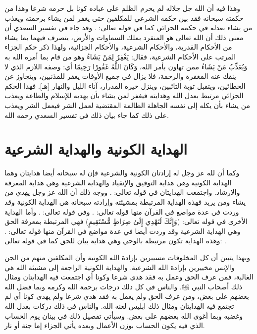 وهذا فيه أن الله جل جلاله لم يحرم الظلم على عباده كونا بل حرمه شرعا وهذا من حكمته سبحانه فقد بين حكمه الشرعي للمكلفين حتى يغفر لمن يشاء برحمته ويعذب من يشاء بعدله في حكمه الجزائي كما في قوله تعالى: 
\quranayah*[48][14]{\footnotesize \surahname*[48]}.  وقد جاء في تفسير السعدي أن معنى ذلك أن الله تعالى هو المنفرد بملك السماوات والأرض، يتصرف فيهما بما يشاء من الأحكام القدرية، والأحكام الشرعية، والأحكام الجزائية، ولهذا ذكر حكم الجزاء المرتب على الأحكام الشرعية، فقال: { يَغْفِرُ لِمَنْ يَشَاءُ } وهو من قام بما أمره الله به { وَيُعَذِّبُ مَنْ يَشَاءُ } ممن تهاون بأمر الله، { وَكَانَ اللَّهُ غَفُورًا رَحِيمًا } أي: وصفه اللازم الذي لا ينفك عنه المغفرة والرحمة، فلا يزال في جميع الأوقات يغفر للمذنبين، ويتجاوز عن الخطائين، ويتقبل توبة التائبين، وينزل خيره المدرار، آناء الليل والنهار [هـ]. فهذا الحكم الجزائي مرتبط بعدل الله وهدايته فيغفر لمن يشاء بأن يهديه للإسلام والطاعة ويعذب من يشاء بأن يكله إلى نفسه الجاهلة الظالمة المقتضية لعمل الشر فيعمل الشر ويعذب على ذلك كما جاء بيان ذلك في تفسير السعدي رحمه الله.

\section{الهداية الكونية والهداية الشرعية}

وكما أن لله عز وجل له إرادتان الكونية والشرعية فإن له سبحانه أيضا هدايتان وهما الهداية الكونية وهي هداية التوفيق والإنقياد والهداية الشرعية وهي هداية المعرفة والإرشاد. واجتمعت الهدايتان في قوله تعالى:
\quranayah*[42][52]{\footnotesize \surahname*[42]}. ووجه ذلك أن الله عز وجل يهدي من يشاء ومن يريد فهذه الهداية المرتبطة بمشيئته وإرادته سبحانه هي الهداية الكونية وقد وردت في عدة مواضع في القرآن منها قوله تعالى:
\quranayah*[28][56]{\footnotesize \surahname*[28]}. وفي قوله تعالى:
\quranayah*[22][16]{\footnotesize \surahname*[22]}. وأما الهداية الأخرى في قوله تعالى: (وَإِنَّكَ لَتَهْدِي إِلَىٰ صِرَاطٍ مُّسْتَقِيمٍ)
فهي المرتبطة بمعرفة الحق وهي الهداية الشرعية وقد وردت أيضا في عدة مواضع في القرآن منها قوله تعالى:
\quranayah*[4][26]{\footnotesize \surahname*[4]}. وهذه الهداية تكون مرتبطة بالوحي وهي هداية بيان للحق كما في قوله تعالى:
\quranayah*[34][6]{\footnotesize \surahname*[6]}.

وبهذا يتبين أن كل المخلوقات مسييرين بإرادة الله الكونية وأن المكلفين منهم من الجن والإنس مخييرين بإرادة الله الشرعية. والهداية الكونية الراجعة إلى مشيئة الله هي الغالبة، فمن عرف الحق وعمل به فقد هدي شرعا وكونا أي اجتمعت فيه الهدايتان ومثال ذلك أصحاب النبي ﷺ. والناس في كل ذلك درجات برحمة الله وكرمه وبما فضل الله بعضهم على بعض،
ومن عرف الحق ولم يعمل به فقد هدي شرعا ولم يهدى كونا أي لم تجتمع فيه الهدايتان ومثال ذلك ابليس لعنه الله. والناس في ذلك دركات بعدل الله وغضبه وبما أغوى الله بعضهم على بعض. وسيأتي تفصيل ذلك في بينان يوم الحساب الذي فيه يكون الحساب بوزن الأعمال وبعده يأتي الجزاء إما جنة أو نار. 

